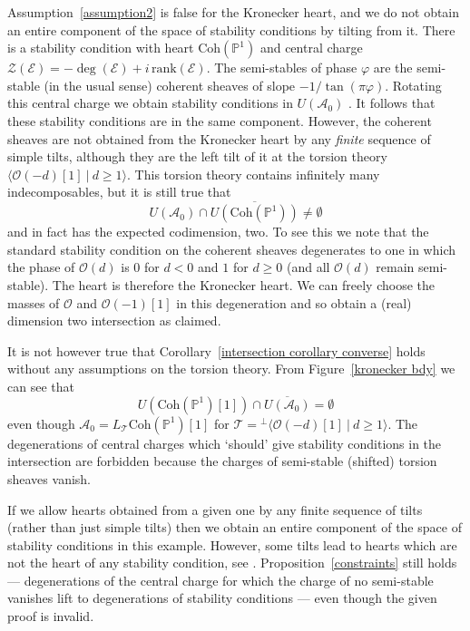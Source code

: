 \documentclass{article}
\theoremstyle{plain}
\theoremstyle{definition}
\theoremstyle{remark}
\renewcommand{\P}{\mathbb{P}}
\newcommand{\cat}[1]{\mathcal{#1}}
\begin{document}
Assumption~\ref{assumption2} is false for the Kronecker heart, and we do not obtain an entire component of the space of stability conditions by tilting from it. There is a stability condition with heart  $\mathrm{Coh}(\P^1)$ and central charge $\mathcal{Z}(\mathcal{E}) = -\deg(\mathcal{E}) + i\, \mathrm{rank}(\mathcal{E})$.  The semi-stables of phase $\varphi$ are the semi-stable (in the usual sense) coherent sheaves of slope $-1/\tan(\pi\varphi)$.  Rotating this central charge we obtain stability conditions in $U(\cat{A}_0)$ \cite[Proposition 2.4]{MR2219846}. It follows that these stability conditions are in the same component. However, the coherent sheaves are not obtained from the Kronecker heart by any \emph{finite} sequence of simple tilts, although they are the left tilt of it at the torsion theory $\langle \mathcal{O}(-d)[1] \ | \ d\geq 1 \rangle$. This torsion theory contains infinitely many indecomposables, but it is still true that 
$$
U(\cat{A}_0)\cap \overline{U(\mathrm{Coh}(\P^1))} \neq \emptyset
$$
and in fact has the expected codimension, two. To see this we note that the standard stability condition on the coherent sheaves degenerates to one in which  the phase of $\mathcal{O}(d)$ is $0$ for $d<0$ and $1$ for $d\geq 0$ (and all $\mathcal{O}(d)$ remain semi-stable). The heart is therefore the Kronecker heart. We can freely choose the masses of $\mathcal{O}$ and $\mathcal{O}(-1)[1]$ in this degeneration and so obtain a (real) dimension two intersection as claimed. 

It is not however true that Corollary~\ref{intersection corollary converse} holds without any assumptions on the torsion theory. From Figure~\ref{kronecker bdy} we can see that
$$
U(\mathrm{Coh}(\P^1)[1])\cap \overline{U(\cat{A}_0)} = \emptyset
$$
even though $\cat{A}_0 = L_\cat{T} \mathrm{Coh}(\P^1)[1]$ for $\cat{T}={}^\perp\langle \mathcal{O}(-d)[1]\ |\ d\geq 1\rangle$. The degenerations of central charges which `should' give stability conditions in the intersection are forbidden because the charges of semi-stable (shifted) torsion sheaves vanish.

If we allow hearts obtained from a given one by any finite sequence of tilts (rather than just simple tilts) then we obtain an entire component of the space of stability conditions in this example. However, some tilts lead to hearts which are not the heart of any stability condition, see \cite[Remark 3.5]{MR2219846}. Proposition~\ref{constraints} still holds --- degenerations of the central charge for which the charge of no semi-stable vanishes lift to degenerations of stability conditions --- even though the given proof is invalid.
\end{document}
